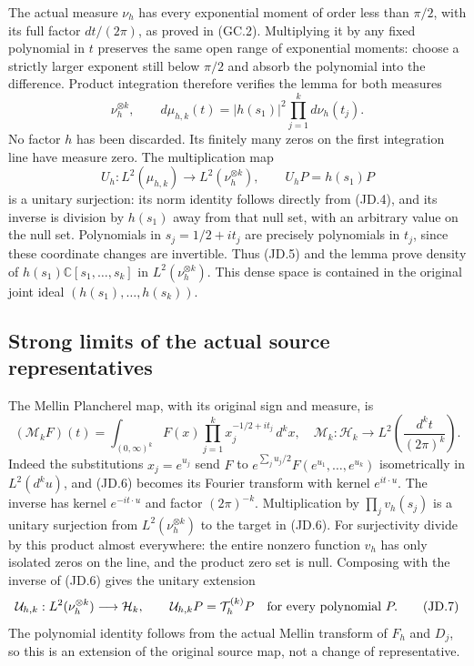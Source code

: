 The actual measure \(\nu_h\) has every exponential moment of
order less than \(\pi/2\), with its full factor \(dt/(2\pi)\),
as proved in (GC.2).  Multiplying it by any fixed polynomial in
\(t\) preserves the same open range of exponential moments:
choose a strictly larger exponent still below \(\pi/2\) and
absorb the polynomial into the difference.  Product integration
therefore verifies the lemma for both measures
\[
 \nu_h^{\otimes k},\qquad
 d\mu_{h,k}(t)=|h(s_1)|^2\prod_{j=1}^k d\nu_h(t_j).
 \tag{JD.4}
\]
No factor \(h\) has been discarded.  Its finitely many zeros on
the first integration line have measure zero.  The multiplication
map
\[
 U_h:L^2(\mu_{h,k})\longrightarrow L^2(\nu_h^{\otimes k}),
 \qquad U_hP=h(s_1)P
 \tag{JD.5}
\]
is a unitary surjection: its norm identity follows directly from
(JD.4), and its inverse is division by \(h(s_1)\) away from
that null set, with an arbitrary value on the null set.  Polynomials
in \(s_j=1/2+it_j\) are precisely polynomials in \(t_j\), since
these coordinate changes are invertible.  Thus (JD.5) and the lemma
prove density of \(h(s_1)\mathbb C[s_1,\ldots,s_k]\) in
\(L^2(\nu_h^{\otimes k})\).  This dense space is contained in
the original joint ideal \((h(s_1),\ldots,h(s_k))\).

\subsection{Strong limits of the actual source representatives}

The Mellin Plancherel map, with its original sign and measure, is
\[
 (\mathcal M_kF)(t)=\int_{(0,\infty)^k}
    F(x)\prod_{j=1}^k x_j^{-1/2+it_j}\,d^kx,
 \quad
 \mathcal M_k:\mathcal H_k\longrightarrow
                 L^2\left(\frac{d^kt}{(2\pi)^k}\right).
 \tag{JD.6}
\]
Indeed the substitutions \(x_j=e^{u_j}\) send \(F\) to
\(e^{\sum_j u_j/2}F(e^{u_1},\ldots,e^{u_k})\) isometrically
in \(L^2(d^ku)\), and (JD.6) becomes its Fourier transform
with kernel \(e^{it\cdot u}\).  The inverse has kernel
\(e^{-it\cdot u}\) and factor \((2\pi)^{-k}\).
Multiplication by \(\prod_jv_h(s_j)\) is a unitary surjection
from \(L^2(\nu_h^{\otimes k})\) to the target in (JD.6).
For surjectivity divide by this product almost everywhere: the
entire nonzero function \(v_h\) has only isolated zeros on
the line, and the product zero set is null.  Composing with the
inverse of (JD.6) gives the unitary extension
\[
 \mathcal U_{h,k}:L^2(\nu_h^{\otimes k})\longrightarrow
 \mathcal H_k,\qquad
 \mathcal U_{h,k}P=\mathcal T_h^{(k)}P
                 \quad\hbox{for every polynomial }P.
 \tag{JD.7}
\]
The polynomial identity follows from the actual Mellin transform of
\(F_h\) and \(D_j\), so this is an extension of the original
source map, not a change of representative.

